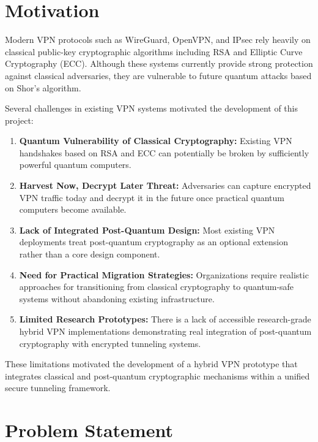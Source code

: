 \section{Motivation}

Modern VPN protocols such as WireGuard, OpenVPN, and IPsec rely heavily on classical public-key cryptographic algorithms including RSA and Elliptic Curve Cryptography (ECC). Although these systems currently provide strong protection against classical adversaries, they are vulnerable to future quantum attacks based on Shor’s algorithm.

Several challenges in existing VPN systems motivated the development of this project:

\begin{enumerate}

    \item \textbf{Quantum Vulnerability of Classical Cryptography:} Existing VPN handshakes based on RSA and ECC can potentially be broken by sufficiently powerful quantum computers.

    \item \textbf{Harvest Now, Decrypt Later Threat:} Adversaries can capture encrypted VPN traffic today and decrypt it in the future once practical quantum computers become available.

    \item \textbf{Lack of Integrated Post-Quantum Design:} Most existing VPN deployments treat post-quantum cryptography as an optional extension rather than a core design component.

    \item \textbf{Need for Practical Migration Strategies:} Organizations require realistic approaches for transitioning from classical cryptography to quantum-safe systems without abandoning existing infrastructure.

    \item \textbf{Limited Research Prototypes:} There is a lack of accessible research-grade hybrid VPN implementations demonstrating real integration of post-quantum cryptography with encrypted tunneling systems.

\end{enumerate}

These limitations motivated the development of a hybrid VPN prototype that integrates classical and post-quantum cryptographic mechanisms within a unified secure tunneling framework.

\section{Problem Statement}

